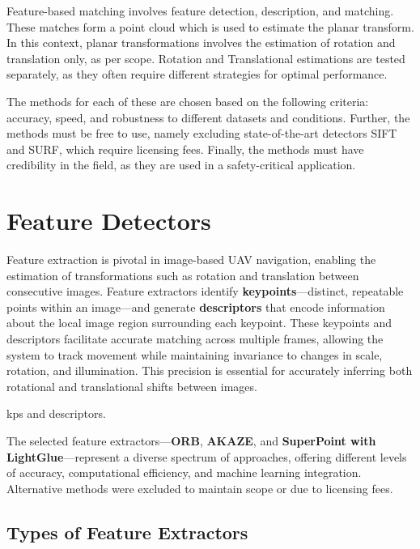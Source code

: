 Feature-based matching involves feature detection, description, and matching. These matches form a point cloud which is used to estimate the planar transform. In this context, planar transformations involves the estimation of rotation and translation only, as per scope. Rotation and Translational estimations are tested separately, as they often require different strategies for optimal performance.  

The methods for each of these are chosen based on the following criteria: accuracy, speed, and robustness to different datasets and conditions. Further, the methods must be free to use, namely excluding state-of-the-art detectors SIFT and SURF, which require licensing fees. Finally, the methods must have credibility in the field, as they are used in a safety-critical application.








\section{Feature Detectors}

Feature extraction is pivotal in image-based UAV navigation, enabling the estimation of transformations such as rotation and translation between consecutive images. Feature extractors identify \textbf{keypoints}—distinct, repeatable points within an image—and generate \textbf{descriptors} that encode information about the local image region surrounding each keypoint. These keypoints and descriptors facilitate accurate matching across multiple frames, allowing the system to track movement while maintaining invariance to changes in scale, rotation, and illumination. This precision is essential for accurately inferring both rotational and translational shifts between images.

kps and descriptors.

The selected feature extractors—\textbf{ORB}, \textbf{AKAZE}, and \textbf{SuperPoint with LightGlue}—represent a diverse spectrum of approaches, offering different levels of accuracy, computational efficiency, and machine learning integration. Alternative methods were excluded to maintain scope or due to licensing fees. 

\subsection{Types of Feature Extractors}

